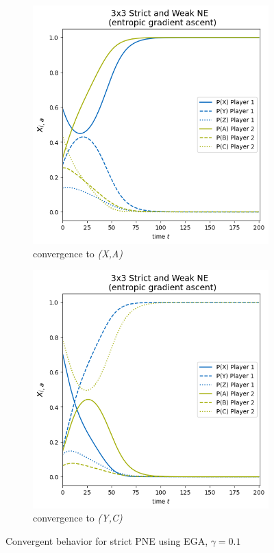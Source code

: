 \begin{figure}[H]
\captionsetup{justification=centering}
\centering
\begin{subfigure}{.5\textwidth}
    \centering
    \includegraphics[width=\textwidth]{logos/Weak3x3a.png}
    \caption{convergence to \textit{(X,A)}}
    \label{fig:Weak3x3a}
\end{subfigure}%
\begin{subfigure}{.5\textwidth}
    \centering
    \includegraphics[width=\textwidth]{logos/Weak3x3b.png}
    \caption{convergence to \textit{(Y,C)}}
    \label{fig:Weak3x3b}
\end{subfigure}
\caption{Convergent behavior for strict PNE using EGA, $\gamma = 0.1$}
\label{fig:Weak3x3-1}
\end{figure}

